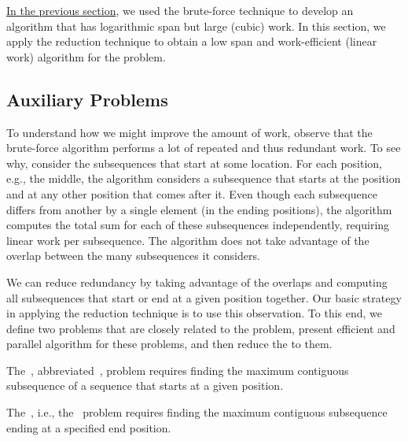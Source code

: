 \begin{gram}
\href{sec:mcss::bf}{In the previous section}, we used the brute-force
technique to develop an algorithm that has logarithmic span but large
(cubic) work.
%
In this section, we apply the reduction technique to obtain a
low span and work-efficient (linear work) algorithm for the \MCSS{}
problem.
\end{gram}

\subsection{Auxiliary Problems}

\begin{gram}
To understand how we might improve the amount of work, observe that
the brute-force algorithm performs a lot of repeated and thus redundant work.
%
To see why, consider the subsequences that start at some location.
For each position, e.g., the middle, the algorithm considers a
subsequence that starts at the position and at any other position that
comes after it.
%
Even though each subsequence differs from another by a single element
(in the ending positions), the algorithm computes the total sum for
each of these subsequences independently, requiring linear work per
subsequence.
%
The algorithm does not take advantage of the overlap between the many subsequences it considers.
\end{gram}

\begin{gram}
We can reduce redundancy by taking advantage of the overlaps and
computing all subsequences that start or end at a given position
together.
%
Our basic strategy in applying the reduction technique is to use this
observation.
%
To this end, we define two problems that are closely related to the
\MCSS{} problem, present efficient and parallel algorithm for these
problems, and then reduce the \MCSS{} to them.
\end{gram}


\begin{definition}[\MCSSS{}]
The~,
abbreviated~, problem requires finding the maximum
contiguous subsequence of a sequence that starts at a given position.
\end{definition}


\begin{definition}
The~, i.e.,
the~ problem requires finding the maximum contiguous
subsequence ending at a specified end position.
\end{definition}



